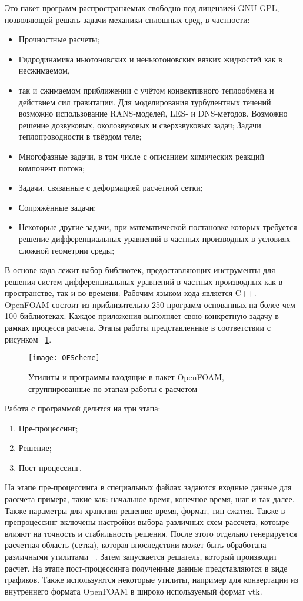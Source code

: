 \documentclass[14pt]{extreport}
\begin{document}
Это пакет программ распространяемых свободно под лицензией GNU GPL, позволяющей решать задачи механики сплошных сред, в частности: 
\begin{itemize}
\item Прочностные расчеты;
\item Гидродинамика ньютоновских и неньютоновских вязких жидкостей как в несжимаемом, \item так и сжимаемом приближении с учётом конвективного теплообмена и действием сил гравитации. Для моделирования турбулентных течений возможно использование RANS-моделей, LES- и DNS-методов. Возможно решение дозвуковых, околозвуковых и сверхзвуковых задач;
Задачи теплопроводности в твёрдом теле;
\item Многофазные задачи, в том числе с описанием химических реакций компонент потока;
\item Задачи, связанные с деформацией расчётной сетки;
\item Сопряжённые задачи;
\item Некоторые другие задачи, при математической постановке которых требуется решение дифференциальных уравнений в частных производных в условиях сложной геометрии среды;
\end{itemize}

В основе кода лежит набор библиотек, предоставляющих инструменты для решения систем дифференциальных уравнений в частных производных как в пространстве, так и во времени. Рабочим языком кода является C++. OpenFOAM состоит из приблизительно 250 программ основанных на более чем 100 библиотеках. Каждое приложения выполняет свою конкретную задачу в рамках процесса расчета. Этапы работы представленные в соответствии с рисунком ~\ref{fig1}.

\begin{figure}[H]
\centerline{\texttt{[image: OFScheme]}}
\caption{Утилиты и программы входящие в пакет OpenFOAM, сгруппированные по этапам работы с расчетом}
\label{fig1}
\end{figure}

Работа с программой делится на три этапа:
\begin{enumerate}
\item Пре-процессинг;
\item Решение;
\item Пост-процессинг.
\end{enumerate}

На этапе пре-процессинга в специальных файлах задаются входные данные для рассчета примера, такие как: начальное время, конечное время, шаг и так далее. Также параметры для хранения решения: время, формат, тип сжатия. Также в препроцессинг включены настройки выбора различных схем рассчета, котоыре влияют на точность и стабильность решения. После этого отдельно генерируется расчетная область (сетка), которая впоследствии может быть обработана различными утилитами ~\cite{OpenfoamUserGuide}. Затем запускается решатель, который производит расчет. На этапе пост-процессинга полученные данные представляются в виде графиков. Также используются некоторые утилиты, например для конвертации из внутреннего формата OpenFOAM в широко используемый формат vtk.
\end{document}
